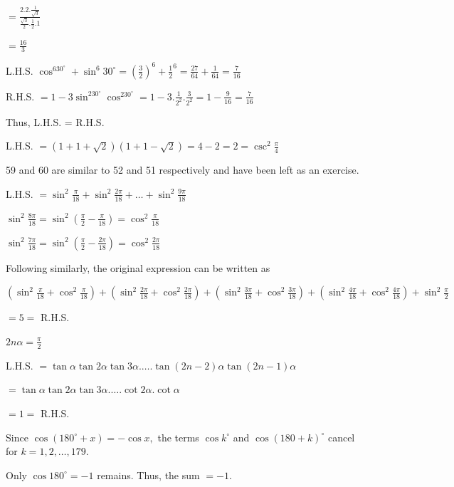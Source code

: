   $= \frac{2.2.\frac{1}{\sqrt{3}}}{\frac{\sqrt{3}}{2}.\frac{1}{2}.1}$

  $= \frac{16}{3}$

\item L.H.S. $\cos^630^\circ + \sin^6 30^\circ = \left(\frac{3}{2}\right)^6 + \frac{1}{2}^6 = \frac{27}{64} + \frac{1}{64} =
  \frac{7}{16}$

  R.H.S. $= 1 - 3\sin^230^\circ\cos^230^\circ = 1 - 3.\frac{1}{2^2}.\frac{3}{2^2} = 1 - \frac{9}{16} = \frac{7}{16}$

  Thus, L.H.S. = R.H.S.

\item L.H.S. $= \left(1 + 1 + \sqrt{2}\right)(1 + 1 - \sqrt{2}) = 4 - 2 = 2 = \csc^2\frac{\pi}{4}$


  59 and 60 are similar to 52 and 51 respectively and have been left as an exercise.


\item L.H.S. $= \sin^2 \frac{\pi}{18} + \sin^2\frac{2\pi}{18} + \ldots + \sin^2\frac{9\pi}{18}$

  $\sin^2\frac{8\pi}{18} = \sin^2\left(\frac{\pi}{2} - \frac{\pi}{18}\right) = \cos^2\frac{\pi}{18}$

  $\sin^2\frac{7\pi}{18} = \sin^2\left(\frac{\pi}{2} - \frac{2\pi}{18}\right) = \cos^2\frac{2\pi}{18}$

  Following similarly, the original expression can be written as

  $\left(\sin^2 \frac{\pi}{18} + \cos^2\frac{\pi}{18}\right) + \left(\sin^2 \frac{2\pi}{18} +
  \cos^2\frac{2\pi}{18}\right) + \left(\sin^2 \frac{3\pi}{18} + \cos^2\frac{3\pi}{18}\right) + \left(\sin^2 \frac{4\pi}{18} +
  \cos^2\frac{4\pi}{18}\right) + \sin^2 \frac{\pi}{2}$

  $= 5 =$ R.H.S.

\item $2n\alpha = \frac{\pi}{2}$

  L.H.S. $= \tan\alpha\tan2\alpha\tan3\alpha. \ldots .\tan(2n - 2)\alpha\tan(2n - 1)\alpha$

  $= \tan\alpha\tan2\alpha\tan3\alpha. \ldots .\cot2\alpha.\cot\alpha$

  $= 1 =$ R.H.S.
\stopitemize

\subject{Challenging Problems}
\startitemize[n, 1*broad]
\item Since $\cos(180^\circ + x) = -\cos x,$ the terms $\cos k^\circ$ and $\cos(180 + k)^\circ$ cancel for $k = 1, 2, \ldots,
  179.$

  Only $\cos 180^\circ = -1$ remains. Thus, the sum $= -1.$

